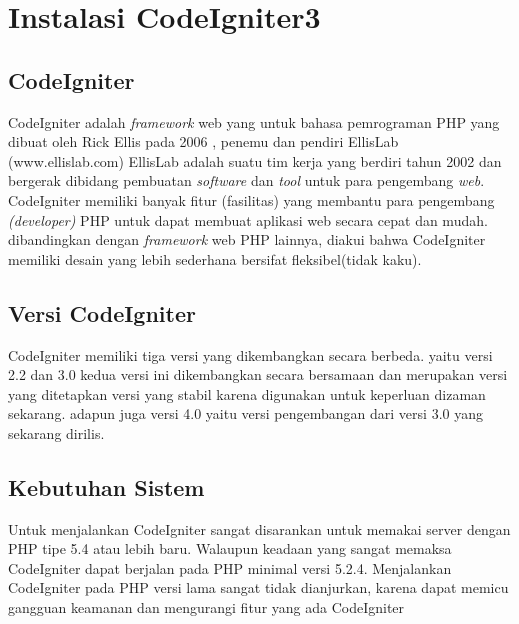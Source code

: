 \section{Instalasi CodeIgniter3}
\subsection{CodeIgniter}
CodeIgniter adalah \textit{framework} web yang untuk bahasa pemrograman PHP yang dibuat oleh Rick Ellis pada 2006 , penemu dan pendiri EllisLab (www.ellislab.com) EllisLab adalah suatu tim kerja yang berdiri tahun 2002 dan bergerak dibidang pembuatan \textit{software} dan \textit{tool} untuk para pengembang \textit{web}.
CodeIgniter memiliki banyak fitur (fasilitas) yang membantu para pengembang \textit{(developer)} PHP untuk dapat membuat aplikasi web secara cepat dan mudah. dibandingkan dengan \textit{framework} web PHP lainnya, diakui bahwa CodeIgniter memiliki desain yang lebih sederhana bersifat fleksibel(tidak kaku).
\subsection{Versi CodeIgniter}
CodeIgniter memiliki tiga versi yang dikembangkan secara berbeda. yaitu versi 2.2 dan 3.0 kedua versi ini dikembangkan secara bersamaan  dan merupakan versi yang ditetapkan versi yang stabil karena digunakan untuk keperluan dizaman sekarang. adapun juga versi 4.0 yaitu versi pengembangan dari versi 3.0 yang sekarang dirilis.
\subsection{Kebutuhan Sistem}
Untuk menjalankan CodeIgniter sangat disarankan untuk memakai server dengan PHP tipe 5.4 atau lebih baru. Walaupun keadaan yang sangat memaksa CodeIgniter dapat berjalan pada PHP minimal versi 5.2.4. Menjalankan CodeIgniter pada PHP versi lama sangat tidak dianjurkan, karena dapat memicu gangguan keamanan dan mengurangi fitur yang ada CodeIgniter
